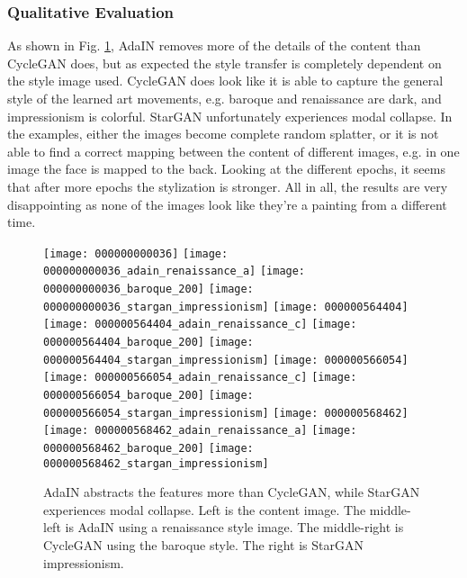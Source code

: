 \subsubsection{Qualitative Evaluation}
As shown in Fig. \ref{fig:difference_AdaIN_CycleGAN}, AdaIN removes more of the details of the content than CycleGAN does, but as expected the style transfer is completely dependent on the style image used.
CycleGAN does look like it is able to capture the general style of the learned art movements, e.g. baroque and renaissance are dark, and impressionism is colorful.
StarGAN unfortunately experiences modal collapse.
In the examples, either the images become complete random splatter, or it is not able to find a correct mapping between the content of different images, e.g. in one image the face is mapped to the back.
Looking at the different epochs, it seems that after more epochs the stylization is stronger.
All in all, the results are very disappointing as none of the images look like they're a painting from a different time.

\begin{figure}
	\centering
	{%
        \texttt{[image: 000000000036]}%
        \texttt{[image: 000000000036\_adain\_renaissance\_a]}%
        \texttt{[image: 000000000036\_baroque\_200]}%
        \texttt{[image: 000000000036\_stargan\_impressionism]}%
	}
	{%
        \texttt{[image: 000000564404]}%
        \texttt{[image: 000000564404\_adain\_renaissance\_c]}%
        \texttt{[image: 000000564404\_baroque\_200]}%
        \texttt{[image: 000000564404\_stargan\_impressionism]}%
	}
	{%
        \texttt{[image: 000000566054]}%
        \texttt{[image: 000000566054\_adain\_renaissance\_c]}%
        \texttt{[image: 000000566054\_baroque\_200]}%
        \texttt{[image: 000000566054\_stargan\_impressionism]}%
	}
	{%
        \texttt{[image: 000000568462]}%
        \texttt{[image: 000000568462\_adain\_renaissance\_a]}%
        \texttt{[image: 000000568462\_baroque\_200]}%
        \texttt{[image: 000000568462\_stargan\_impressionism]}%
	}
	\caption{AdaIN abstracts the features more than CycleGAN, while StarGAN experiences modal collapse. Left is the content image. The middle-left is AdaIN using a renaissance style image. The middle-right is CycleGAN using the baroque style. The right is StarGAN impressionism.}
	\label{fig:difference_AdaIN_CycleGAN}
\end{figure}

